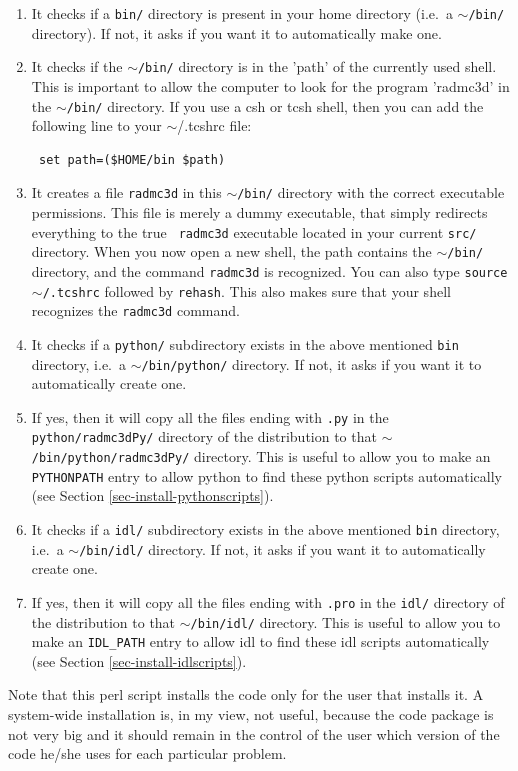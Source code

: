 \documentclass{report}
\begin{document}
\begin{enumerate}
\item It checks if a {\small\tt bin/} directory is present in your home
  directory (i.e.\ a $\sim${\small\tt /bin/} directory). If not, it asks if
  you want it to automatically make one.
\item It checks if the $\sim${\small\tt /bin/} directory is in the 'path' of
  the currently used shell. This is important to allow the computer to look
  for the program 'radmc3d' in the $\sim${\small\tt /bin/} directory. If you
  use a csh or tcsh shell, then you can add the following line to your
  $\sim${/.tcshrc} file: {\small\begin{verbatim} set path=($HOME/bin $path)
\end{verbatim}}
\item It creates a file {\small\tt radmc3d} in this $\sim${\small\tt /bin/}
  directory with the correct executable permissions. This file is merely a
  dummy executable, that simply redirects everything to the true {\small\tt
    radmc3d} executable located in your current {\small\tt src/}
  directory. When you now open a new shell, the path contains the
  $\sim${\small\tt /bin/} directory, and the command {\small\tt radmc3d} is
  recognized. You can also type {\small\tt source $\sim${/.tcshrc}} followed
  by {\small\tt rehash}. This also makes sure that your shell recognizes the
  {\small\tt radmc3d} command.
\item It checks if a {\small\tt python/} subdirectory exists in the above
  mentioned {\small\tt bin} directory, i.e.\ a $\sim${\small\tt /bin/python/}
  directory. If not, it asks if you want it to automatically create one.
\item If yes, then it will copy all the files ending with {\small\tt .py} in
  the {\small\tt python/radmc3dPy/} directory of the distribution to that
  $\sim${\small\tt /bin/python/radmc3dPy/} directory. This is useful to
  allow you to make an {\small\tt PYTHONPATH} entry to allow python to find
  these python scripts automatically (see Section
  \ref{sec-install-pythonscripts}).
\item It checks if a {\small\tt idl/} subdirectory exists in the above
  mentioned {\small\tt bin} directory, i.e.\ a $\sim${\small\tt /bin/idl/}
  directory. If not, it asks if you want it to automatically create one.
\item If yes, then it will copy all the files ending with {\small\tt .pro}
  in the {\small\tt idl/} directory of the distribution to that
  $\sim${\small\tt /bin/idl/} directory. This is useful to allow you to make
  an {\small\tt IDL\_PATH} entry to allow idl to find these idl scripts
  automatically (see Section \ref{sec-install-idlscripts}).
\end{enumerate}
Note that this perl script installs the code only for the user that installs
it. A system-wide installation is, in my view, not useful, because the code
package is not very big and it should remain in the control of the user
which version of the code he/she uses for each particular problem.
\end{document}
